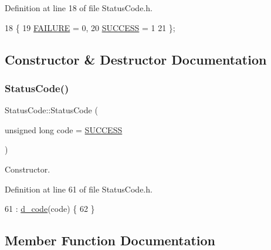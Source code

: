 Definition at line 18 of file Status\+Code.\+h.


\begin{DoxyCode}
18             \{
19     \hyperlink{classStatusCode_a6f565cbeadc76d14c72f047e5e85eb4ba3da73d4c469762eb9d3c960368252b26}{FAILURE} = 0,
20     \hyperlink{classStatusCode_a6f565cbeadc76d14c72f047e5e85eb4badd0da38d3ba0d922efd1f4619bc37ad8}{SUCCESS} = 1
21   \};
\end{DoxyCode}


\subsection{Constructor \& Destructor Documentation}
\mbox{\label{classStatusCode_aaf803a555dd2d841418328a747059b3e}} 
\subsubsection{\texorpdfstring{Status\+Code()}{StatusCode()}}
{\footnotesize\ttfamily Status\+Code\+::\+Status\+Code (\begin{DoxyParamCaption}\item[{unsigned long}]{code = {\ttfamily \hyperlink{classStatusCode_a6f565cbeadc76d14c72f047e5e85eb4badd0da38d3ba0d922efd1f4619bc37ad8}{S\+U\+C\+C\+E\+SS}} }\end{DoxyParamCaption})\hspace{0.3cm}{\ttfamily [inline]}}



Constructor. 



Definition at line 61 of file Status\+Code.\+h.


\begin{DoxyCode}
61                                                   : \hyperlink{classStatusCode_aff37ebcb323b897044b42d303cf72d93}{d\_code}(code) \{
62 \}
\end{DoxyCode}


\subsection{Member Function Documentation}
\mbox{\label{classStatusCode_a5dd22dc6eb2c52fc4cabc58f6dea2eb7}} 
